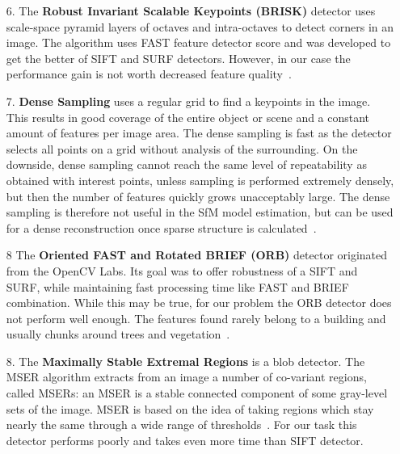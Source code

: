 \begin{itemize}
	\item[6.] The \textbf{Robust Invariant Scalable Keypoints (BRISK)} detector uses scale-space pyramid layers of octaves and intra-octaves to detect corners in an image. The algorithm uses FAST feature detector score and was developed to get the better of SIFT and SURF detectors. However, in our case the performance gain is not worth decreased feature quality~\cite{article:brisk}.
	
	\item[7.] \textbf{Dense Sampling} uses a regular grid to find a keypoints in the image. This results in good coverage of the entire object or scene and a constant amount of features per image area. The dense sampling is fast as the detector selects all points on a grid without analysis of the surrounding. On the downside, dense sampling cannot reach the same level of repeatability as obtained with interest points, unless sampling is performed extremely densely, but then the number of features quickly grows unacceptably large. The dense sampling is therefore not useful in the SfM model estimation, but can be used for a dense reconstruction once sparse structure is calculated~\cite{article:dense}.
	
	\item[8] The \textbf{Oriented FAST and Rotated BRIEF (ORB)} detector originated from the OpenCV Labs. Its goal was to offer robustness of a SIFT and SURF, while maintaining fast processing time like FAST and BRIEF combination. While this may be true, for our problem the ORB detector does not perform well enough. The features found rarely belong to a building and usually chunks around trees and vegetation~\cite{www:orb, article:orb}.
	
	\item[8.] The \textbf{Maximally Stable Extremal Regions} is a blob detector. The MSER algorithm extracts from an image a number of co-variant regions, called MSERs: an MSER is a stable connected component of some gray-level sets of the image. MSER is based on the idea of taking regions which stay nearly the same through a wide range of thresholds~\cite{mser}. For our task this detector performs poorly and takes even more time than SIFT detector.
\end{itemize}

